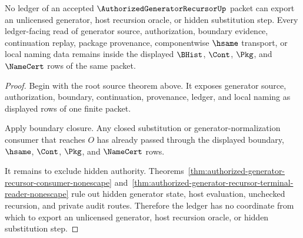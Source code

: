 \begin{theorem}
\label{thm:authorized-generator-recursor-ledger-nonescape}
No ledger of an accepted $\AuthorizedGeneratorRecursorUp$ packet can export an unlicensed generator, host recursion oracle, or hidden substitution step. Every ledger-facing read of generator source, authorization, boundary evidence, continuation replay, package provenance, componentwise $\hsame$ transport, or local naming data remains inside the displayed $\BHist$, $\Cont$, $\Pkg$, and $\NameCert$ rows of the same packet.
\end{theorem}
\begin{proof}
Begin with the root source theorem above. It exposes generator source, authorization, boundary, continuation, provenance, ledger, and local naming as displayed rows of one finite packet.

Apply boundary closure. Any closed substitution or generator-normalization consumer that reaches $O$ has already passed through the displayed boundary, $\hsame$, $\Cont$, $\Pkg$, and $\NameCert$ rows.

It remains to exclude hidden authority. Theorems~\ref{thm:authorized-generator-recursor-consumer-nonescape} and~\ref{thm:authorized-generator-recursor-terminal-reader-nonescape} rule out hidden generator state, host evaluation, unchecked recursion, and private audit routes. Therefore the ledger has no coordinate from which to export an unlicensed generator, host recursion oracle, or hidden substitution step.
\end{proof}

